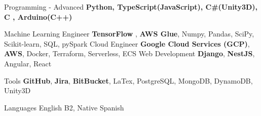 \cvskill
{Programming - Advanced} %
{\textbf{Python, TypeScript(JavaScript), C\#(Unity3D), C , Arduino(C++)}} %

\cvskill
{Machine Learning Engineer}
{\textbf{TensorFlow} , \textbf{AWS Glue}, Numpy, Pandas, SciPy, Scikit-learn, SQL, pySpark}
\cvskill
{Cloud Engineer}
{\textbf{Google Cloud Services (GCP)}, \textbf{AWS}, Docker, Terraform, Serverless, ECS}
\cvskill
{Web Development} %
{\textbf{Django}, \textbf{NestJS}, Angular, React} %

\cvskill
{Tools}
{\textbf{GitHub}, \textbf{Jira}, \textbf{BitBucket}, LaTex, PostgreSQL, MongoDB, DynamoDB, Unity3D}

\cvskill
{Languages} %
{English B2, Native Spanish} %

